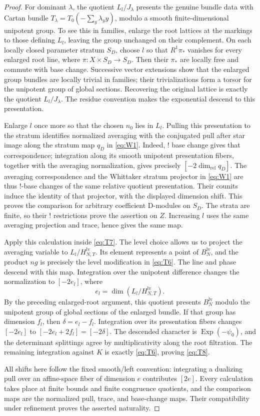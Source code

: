 \documentclass[11pt]{article}
\numberwithin{equation}{section}
\theoremstyle{definition}
\theoremstyle{remark}
\begin{document}
\begin{proof}
For dominant $\lambda$, the quotient $L_l/J_\lambda$ presents the
genuine bundle data with Cartan bundle
$T_\lambda=T_0(-\sum_y\lambda_y y)$, modulo a smooth finite-dimensional
unipotent group.  To see this in families, enlarge the root lattices
at the markings to those defining $L_l$, leaving the group unchanged
on their complement.  On each locally closed parameter stratum $S_D$,
choose $l$ so that
$R^1\pi_*$ vanishes for every enlarged root line, where
$\pi:X\times S_D\to S_D$.  Then their $\pi_*$ are locally free and
commute with base change.  Successive vector extensions show that
the enlarged group bundles are locally trivial in families; their trivializations form a torsor for the
unipotent group of global sections.  Recovering the original lattice
is exactly the quotient $L_l/J_\lambda$.  The residue convention
makes the exponential descend to this presentation.

Enlarge $l$ once more so that the chosen $n_0$ lies in $L_l$.
Pulling this presentation to the stratum identifies normalized
averaging with the conjugated pull after star image along the
stratum map $q_D$ in \eqref{eq:W1}.  Indeed, $!$ base change gives
that correspondence; integration along its smooth unipotent
presentation fibers, together with the averaging normalization,
gives precisely $[-2\dim_{\mathrm{rel}}q_D]$.  The averaging correspondence
and the Whittaker stratum projector
in \eqref{eq:W1} are thus $!$-base changes of the same relative quotient
presentation.  Their counits induce the identity of that projector,
with the displayed dimension shift.  This proves the comparison for
arbitrary coefficient D-modules on $S_D$.  The strata are finite, so
their $!$ restrictions
prove the assertion on $Z$.  Increasing $l$ uses the same averaging
projection and trace, hence gives the same map.

Apply this calculation inside \eqref{eq:T7}.  The level choice allows
us to project the averaging variable to
$L_l/H_{N,T}^{\mathrm{lv}}$.  Its element represents a point of
$B_N^{\mathrm{lv}}$, and the product $ng$ is precisely the level
modification in \eqref{eq:T6}.  The line and phase descend with this
map.  Integration over the unipotent difference changes the
normalization to $[-2e_l]$, where
\[
 e_l=\dim(L_l/H_{N,T}^{\mathrm{lv}}).
\]
By the preceding enlarged-root argument, this quotient presents
$B_N^{\mathrm{lv}}$ modulo the unipotent group of global sections of
the enlarged bundle.  If that group has dimension $f_l$, then
$\delta=e_l-f_l$.  Integration over its presentation fibers changes
$[-2e_l]$ to $[-2e_l+2f_l]=[-2\delta]$.
The descended character is $\operatorname{Exp}(-\psi_0)$, and the
determinant splittings agree by multiplicativity along the root
filtration.  The remaining integration against $K$ is exactly
\eqref{eq:T6}, proving \eqref{eq:T8}.

All shifts here follow the fixed smooth/left convention: integrating
a dualizing pull over an affine-space fiber of dimension $e$
contributes $[2e]$.  Every calculation takes place at finite bounds
and finite congruence quotients, and the comparison maps are the
normalized pull, trace, and base-change maps.  Their compatibility
under refinement proves the asserted naturality.
\end{proof}
\end{document}
